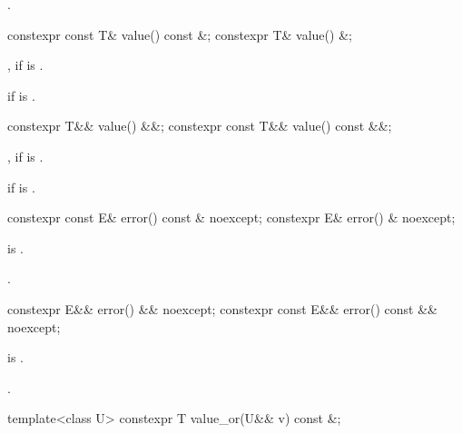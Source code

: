 \begin{itemdescr}
\pnum
\returns
{}.
\end{itemdescr}

%
\begin{itemdecl}
constexpr const T& value() const &;
constexpr T& value() &;
\end{itemdecl}

\begin{itemdescr}
\pnum
\returns
{}, if  is .

\pnum
\throws
{} if  is .
\end{itemdescr}

%
\begin{itemdecl}
constexpr T&& value() &&;
constexpr const T&& value() const &&;
\end{itemdecl}

\begin{itemdescr}
\pnum
\returns
{}, if  is .

\pnum
\throws
{}
if  is .
\end{itemdescr}

%
\begin{itemdecl}
constexpr const E& error() const & noexcept;
constexpr E& error() & noexcept;
\end{itemdecl}

\begin{itemdescr}
\pnum
\expects
{} is .

\pnum
\returns
{}.
\end{itemdescr}

%
\begin{itemdecl}
constexpr E&& error() && noexcept;
constexpr const E&& error() const && noexcept;
\end{itemdecl}

\begin{itemdescr}
\pnum
\expects
{} is .

\pnum
\returns
{}.
\end{itemdescr}

%
\begin{itemdecl}
template<class U> constexpr T value_or(U&& v) const &;
\end{itemdecl}

